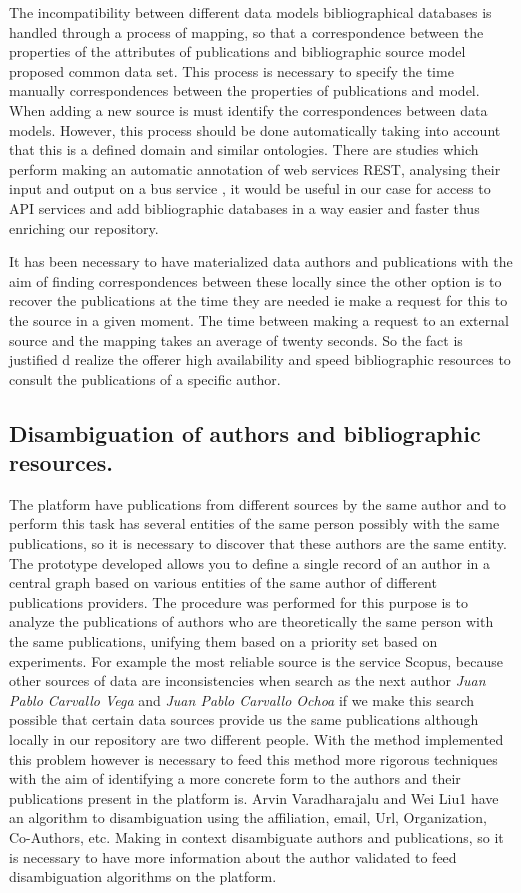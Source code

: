 \documentclass[11pt]{article}
\begin{document}
The incompatibility between different data models bibliographical databases is handled through a process of mapping, so that a correspondence between the properties of the attributes of publications and bibliographic source model proposed common data set. This process is necessary to specify the time manually correspondences between the properties of publications and model. When adding a new source is must identify the correspondences between data models. However, this process should be done automatically taking into account that this is a defined domain and similar ontologies.
There are studies which perform making an automatic annotation of web services REST, analysing their input and output  on a bus service \cite{ortiz}, it would be useful in our case for access to API services and add bibliographic databases in a way easier and faster thus enriching our repository.

It has been necessary to have materialized data authors and publications with the aim of finding correspondences between these locally since the other option is to recover the publications at the time they are needed ie make a request for this to the source in a given moment. The time between making a request to an external source and the mapping takes an average of twenty seconds. So the fact is justified d realize the offerer high availability and speed bibliographic resources to consult the publications of a specific author.

\subsection{Disambiguation of authors and bibliographic resources.}

The platform have publications from different sources by the same author and to perform this task has several entities of the same person possibly with the same publications, so it is necessary to discover that these authors are the same entity. The prototype developed allows you to define a single record of an author in a central graph based on various entities of the same author of different publications providers. The procedure was performed for this purpose is to analyze the publications of authors who are theoretically the same person with the same publications, unifying them based on a priority set based on experiments. For example the most reliable source is the service Scopus, because other sources of data are inconsistencies when search as the next author   \textit{Juan Pablo Carvallo Vega} and \textit{Juan Pablo Carvallo Ochoa} if we make this search possible that certain data sources provide us the same publications although locally in our repository are two different people. With the method implemented this problem however is necessary to feed this method more rigorous techniques with the aim of identifying a more concrete form to the authors and their publications present in the platform is. Arvin Varadharajalu and Wei Liu1 \cite{varadharajalu2011author} have an algorithm to disambiguation using the affiliation, email, Url, Organization, Co-Authors, etc. Making in context disambiguate authors and publications, so it is necessary to have more information about the author validated to feed disambiguation algorithms on the platform.
\end{document}
